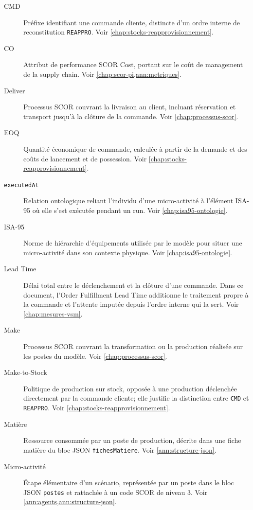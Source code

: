 \begin{description}
\item[CMD] Préfixe identifiant une commande cliente, distincte d'un ordre interne de reconstitution \texttt{REAPPRO}. Voir \cref{chap:stocks-reapprovisionnement}.

\item[CO] Attribut de performance SCOR Cost, portant sur le coût de management de la supply chain. Voir \cref{chap:scor-pi,ann:metriques}.

\item[Deliver] Processus SCOR couvrant la livraison au client, incluant réservation et transport jusqu'à la clôture de la commande. Voir \cref{chap:processus-scor}.

\item[EOQ] Quantité économique de commande, calculée à partir de la demande et des coûts de lancement et de possession. Voir \cref{chap:stocks-reapprovisionnement}.

\item[\texttt{executedAt}] Relation ontologique reliant l'individu d'une micro-activité à l'élément ISA-95 où elle s'est exécutée pendant un run. Voir \cref{chap:isa95-ontologie}.

\item[ISA-95] Norme de hiérarchie d'équipements utilisée par le modèle pour situer une micro-activité dans son contexte physique. Voir \cref{chap:isa95-ontologie}.

\item[Lead Time] Délai total entre le déclenchement et la clôture d'une commande. Dans ce document, l'Order Fulfillment Lead Time additionne le traitement propre à la commande et l'attente imputée depuis l'ordre interne qui la sert. Voir \cref{chap:mesures-vsm}.

\item[Make] Processus SCOR couvrant la transformation ou la production réalisée sur les postes du modèle. Voir \cref{chap:processus-scor}.

\item[Make-to-Stock] Politique de production sur stock, opposée à une production déclenchée directement par la commande cliente; elle justifie la distinction entre \texttt{CMD} et \texttt{REAPPRO}. Voir \cref{chap:stocks-reapprovisionnement}.

\item[Matière] Ressource consommée par un poste de production, décrite dans une fiche matière du bloc JSON \texttt{fichesMatiere}. Voir \cref{ann:structure-json}.

\item[Micro-activité] Étape élémentaire d'un scénario, représentée par un poste dans le bloc JSON \texttt{postes} et rattachée à un code SCOR de niveau 3. Voir \cref{ann:agents,ann:structure-json}.


\end{description}

